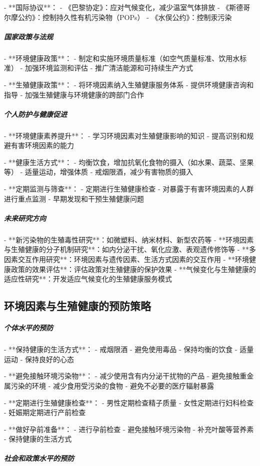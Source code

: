 \begin{enumerate}
- **国际协议**：
  - 《巴黎协定》：应对气候变化，减少温室气体排放
  - 《斯德哥尔摩公约》：控制持久性有机污染物（POPs）
  - 《水俣公约》：控制汞污染

\subparagraph{国家政策与法规}

- **环境健康政策**：
  - 制定和实施环境质量标准（如空气质量标准、饮用水标准）
  - 加强环境监测和评估
  - 推广清洁能源和可持续生产方式

- **生殖健康政策**：
  - 将环境因素纳入生殖健康服务体系
  - 提供环境健康咨询和指导
  - 加强生殖健康与环境健康的跨部门合作

\subparagraph{个人防护与健康促进}

- **环境健康素养提升**：
  - 学习环境因素对生殖健康影响的知识
  - 提高识别和规避有害环境因素的能力

- **健康生活方式**：
  - 均衡饮食，增加抗氧化食物的摄入（如水果、蔬菜、坚果等）
  - 适量运动，增强体质
  - 戒烟限酒，减少有害物质的摄入

- **定期监测与筛查**：
  - 定期进行生殖健康检查
  - 对暴露于有害环境因素的人群进行重点监测
  - 早期发现和干预生殖健康问题

\subparagraph{未来研究方向}

- **新污染物的生殖毒性研究**：如微塑料、纳米材料、新型农药等
- **环境因素与生殖健康的分子机制研究**：如内分泌干扰、氧化应激、表观遗传修饰等
- **多因素交互作用研究**：环境因素与遗传因素、生活方式因素的交互作用
- **环境健康政策的效果评估**：评估政策对生殖健康的保护效果
- **气候变化与生殖健康的适应性研究**：开发适应气候变化的生殖健康服务模式

\subsection{环境因素与生殖健康的预防策略}

\subparagraph{个体水平的预防}

- **保持健康的生活方式**：
  - 戒烟限酒
  - 避免使用毒品
  - 保持均衡的饮食
  - 适量运动
  - 保持良好的心态

- **避免接触环境污染物**：
  - 减少使用含有内分泌干扰物的产品
  - 避免接触重金属污染的环境
  - 减少食用受污染的食物
  - 避免不必要的医疗辐射暴露

- **定期进行生殖健康检查**：
  - 男性定期检查精子质量
  - 女性定期进行妇科检查
  - 妊娠期定期进行产前检查

- **做好孕前准备**：
  - 进行孕前检查
  - 避免接触环境污染物
  - 补充叶酸等营养素
  - 保持健康的生活方式

\subparagraph{社会和政策水平的预防}


\end{enumerate}
